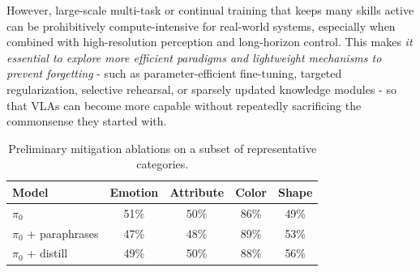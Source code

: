 \documentclass[11pt]{article}
\newcommand{\heatG}[1]{\cellcolor{mygreen}#1}
\newcommand{\heatLG}[1]{\cellcolor{mylightgreen}#1}
\newcommand{\heatO}[1]{\cellcolor{myorange}#1}
\begin{document}
However, large-scale multi-task or continual training that keeps many skills active can be prohibitively compute-intensive for real-world systems, especially when combined with high-resolution perception and long-horizon control.
This makes \textit{it essential to explore more efficient paradigms and lightweight mechanisms to prevent forgetting} - such as parameter-efficient fine-tuning, targeted regularization, selective rehearsal, or sparsely updated knowledge modules - so that VLAs can become more capable without repeatedly sacrificing the commonsense they started with.

\begin{table}[t]
\centering
\footnotesize
\setlength{\tabcolsep}{3pt}
\renewcommand{\arraystretch}{0.95}

\caption{Preliminary mitigation ablations on a subset of representative categories.}
\label{tab:appendix_mitigation_ablation}

\begin{tabular}{lcccc}
\toprule
\textbf{Model}
& \textbf{Emotion}
& \textbf{Attribute}
& \textbf{Color}
& \textbf{Shape} \\
\midrule

$\pi_0$
& \heatO{51\%} & \heatO{50\%} & \heatG{86\%} & \heatO{49\%} \\
$\pi_0$ + paraphrases
& \heatO{47\%} & \heatO{48\%} & \heatG{89\%} & \heatO{53\%} \\
$\pi_0$ + distill
& \heatO{49\%} & \heatO{50\%} & \heatG{88\%} & \heatLG{56\%} \\

\bottomrule
\end{tabular}
\end{table}
\end{document}

